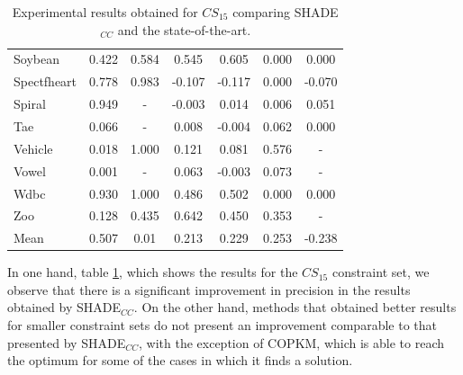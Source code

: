\documentclass[review]{elsarticle}
\begin{document}
\begin{table}[!h]
{\begin{tabular}{lcccccc}
			Soybean & 0.422 & 0.584 & 0.545 & 0.605 & 0.000 & 0.000 \\
			Spectfheart & 0.778 & 0.983 & -0.107 & -0.117 & 0.000 & -0.070 \\
			Spiral & 0.949 & - & -0.003 & 0.014 & 0.006 & 0.051 \\
			Tae & 0.066 & - & 0.008 & -0.004 & 0.062 & 0.000 \\
			Vehicle & 0.018 & 1.000 & 0.121 & 0.081 & 0.576 & - \\
			Vowel & 0.001 & - & 0.063 & -0.003 & 0.073 & - \\
			Wdbc & 0.930 & 1.000 & 0.486 & 0.502 & 0.000 & 0.000 \\
			Zoo & 0.128 & 0.435 & 0.642 & 0.450 & 0.353 & - \\
			\hline
			Mean  & 0.507 & 0.01 & 0.213 & 0.229 & 0.253 & -0.238 \\
			\hline
		\end{tabular}}
		
	\caption{Experimental results obtained for $CS_{15}$ comparing SHADE$_{CC}$ and the state-of-the-art.}
	\label{tab:results15SOTA}
\end{table}

In one hand, table \ref{tab:results15SOTA}, which shows the results for the $CS_{15}$ constraint set, we observe that there is a significant improvement in precision in the results obtained by SHADE$_{CC}$. On the other hand, methods that obtained better results for smaller constraint sets do not present an improvement comparable to that presented by SHADE$_{CC}$, with the exception of COPKM, which is able to reach the optimum for some of the cases in which it finds a solution.
\end{document}

